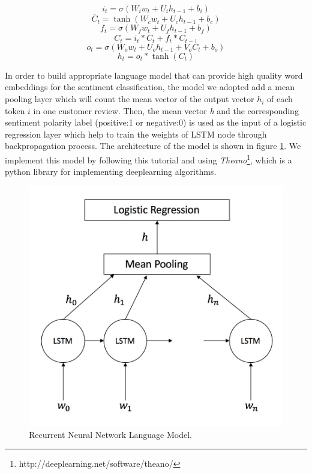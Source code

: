 \documentclass{article}
\begin{document}
$$i_{t}=\sigma(W_{i}w_{t}+U_{i}h_{t-1}+b_{i})$$
$$\overline {C}_{t}=\tanh(W_{c}w_{t}+U_{c}h_{t-1}+b_{c})$$
$$f_{t}=\sigma(W_{f}w_{t}+U_{f}h_{t-1}+b_{f})$$
$$C_{t}=i_{t}\ast \overline {C}_{t} + f_{t} \ast C_{t-1}$$
$$o_{t}=\sigma(W_{o}w_{t}+U_{o}h_{t-1}+V_{o}C_{t}+b_{o})$$
$$h_{t}=o_{t} \ast \tanh(C_{t})$$
 
In order to build appropriate language model that can provide high quality word embeddings for the sentiment classification, the model we adopted add a mean pooling layer which will count the mean vector of the output vector $h_{i}$ of each token $i$ in one customer review. Then, the mean vector \textit{h} and the corresponding sentiment polarity label (positive:1 or negative:0) is used as the input of a logistic regression layer which help to train the weights of LSTM node through backpropagation process. The architecture of the model is shown in figure \ref{fig:lstmmodel}. We implement this model by following this tutorial \cite{lstmtutorial} and using \textit{Theano}\footnote{http://deeplearning.net/software/theano/}, which is a python library for implementing deeplearning algorithms.
\begin{figure}[htb]
\centering
\includegraphics[scale=0.2]{LSTMMODEL.png}
\caption{Recurrent Neural Network Language Model.}
\label{fig:lstmmodel}
\end{figure}
\end{document}
